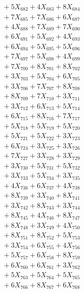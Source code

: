 \documentclass[a4paper,10pt]{article}
\begin{document}
{\begin{align}
&\;  + 5 X_{682} + 4 X_{683} + 8 X_{684} \\[0.3ex]
&\;  + 7 X_{685} + 7 X_{686} + 6 X_{687} \\[0.3ex]
&\;  + 4 X_{688} + 7 X_{689} + 7 X_{690} \\[0.3ex]
&\;  + 6 X_{691} + 5 X_{692} + 4 X_{693} \\[0.3ex]
&\;  + 6 X_{694} + 5 X_{695} + 5 X_{696} \\[0.3ex]
&\;  + 7 X_{697} + 5 X_{698} + 4 X_{699} \\[0.5ex]\allowbreak
&\;  + 7 X_{700} + 8 X_{701} + 8 X_{702} \\[0.3ex]
&\;  + 3 X_{703} + 5 X_{704} + 6 X_{705} \\[0.3ex]
&\;  + 3 X_{706} + 7 X_{707} + 8 X_{708} \\[0.3ex]
&\;  + 8 X_{709} + 7 X_{710} + 3 X_{711} \\[0.3ex]
&\;  + 3 X_{712} + 6 X_{713} + 5 X_{714} \\[0.3ex]
&\;  + 6 X_{715} + 8 X_{716} + 7 X_{717} \\[0.3ex]
&\;  + 5 X_{718} + 5 X_{719} + 5 X_{720} \\[0.3ex]
&\;  + 5 X_{721} + 5 X_{722} + 3 X_{723} \\[0.3ex]
&\;  + 6 X_{724} + 3 X_{725} + 3 X_{726} \\[0.3ex]
&\;  + 7 X_{727} + 3 X_{728} + 3 X_{729} \\[0.5ex]\allowbreak
&\;  + 3 X_{730} + 5 X_{731} + 5 X_{732} \\[0.3ex]
&\;  + 3 X_{733} + 5 X_{734} + 3 X_{735} \\[0.3ex]
&\;  + 4 X_{736} + 6 X_{737} + 4 X_{738} \\[0.3ex]
&\;  + 8 X_{739} + 3 X_{740} + 8 X_{741} \\[0.3ex]
&\;  + 3 X_{742} + 8 X_{743} + 3 X_{744} \\[0.3ex]
&\;  + 8 X_{745} + 4 X_{746} + 8 X_{747} \\[0.3ex]
&\;  + 8 X_{748} + 3 X_{749} + 4 X_{750} \\[0.3ex]
&\;  + 8 X_{751} + 8 X_{752} + 5 X_{753} \\[0.3ex]
&\;  + 3 X_{754} + 6 X_{755} + 4 X_{756} \\[0.3ex]
&\;  + 5 X_{757} + 6 X_{758} + 8 X_{759} \\[0.5ex]\allowbreak
&\;  + 6 X_{760} + 6 X_{761} + 3 X_{762} \\[0.3ex]
&\;  + 5 X_{763} + 5 X_{764} + 5 X_{765} \\[0.3ex]
&\;  + 6 X_{766} + 8 X_{767} + 6 X_{768} \\[0.3ex]

\end{align}}
\end{document}

